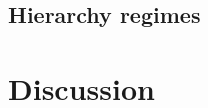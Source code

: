 \documentclass[english,fleqn,allpages]{ISTE_science}[2018/07/30]
\begin{document}
\subsection{Hierarchy regimes}









\section{Discussion}




















\end{document}
